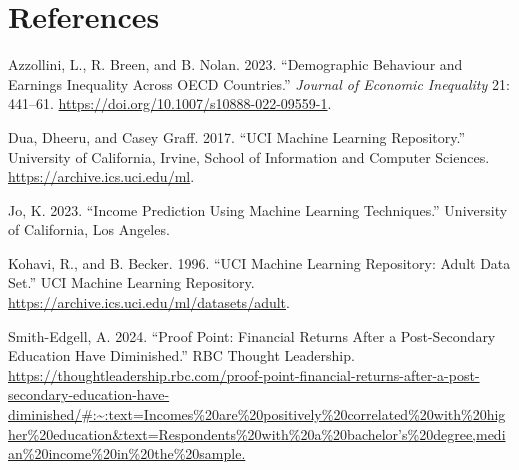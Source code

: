 \documentclass[
  letterpaper,
  DIV=11,
  numbers=noendperiod]{scrartcl}
\newlength{\cslhangindent}
\newlength{\cslentryspacingunit} %
\newenvironment{CSLReferences}[2] %
 {%
  \setlength{\parindent}{0pt}
  \ifodd #1
  \let\oldpar\par
  \def\par{\hangindent=\cslhangindent\oldpar}
  \fi
  \setlength{\parskip}{#2\cslentryspacingunit}
 }%
 {}
\begin{document}
\hypertarget{references}{%
\section*{References}\label{references}}

\hypertarget{refs}{}
\begin{CSLReferences}{1}{0}
\leavevmode{}%
Azzollini, L., R. Breen, and B. Nolan. 2023. {``Demographic Behaviour
and Earnings Inequality Across {OECD} Countries.''} \emph{Journal of
Economic Inequality} 21: 441--61.
\url{https://doi.org/10.1007/s10888-022-09559-1}.

\leavevmode{}%
Dua, Dheeru, and Casey Graff. 2017. {``{UCI} Machine Learning
Repository.''} University of California, Irvine, School of Information
and Computer Sciences. \url{https://archive.ics.uci.edu/ml}.

\leavevmode{}%
Jo, K. 2023. {``Income Prediction Using Machine Learning Techniques.''}
University of California, Los Angeles.

\leavevmode{}%
Kohavi, R., and B. Becker. 1996. {``{UCI} Machine Learning Repository:
Adult Data Set.''} UCI Machine Learning Repository.
\url{https://archive.ics.uci.edu/ml/datasets/adult}.

\leavevmode{}%
Smith-Edgell, A. 2024. {``Proof Point: Financial Returns After a
Post-Secondary Education Have Diminished.''} RBC Thought Leadership.
\url{https://thoughtleadership.rbc.com/proof-point-financial-returns-after-a-post-secondary-education-have-diminished/\#:~:text=Incomes\%20are\%20positively\%20correlated\%20with\%20higher\%20education\&text=Respondents\%20with\%20a\%20bachelor’s\%20degree,median\%20income\%20in\%20the\%20sample.}

\end{CSLReferences}
\end{document}
